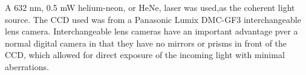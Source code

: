 
%
%
%
\clearpage


A 632 nm, 0.5 mW helium-neon, or HeNe, laser was used,as the coherent light
source.
The CCD used was from a Panasonic Lumix DMC-GF3 interchangeable lens camera.
Interchangeable lens cameras have an important advantage pver a normal digital
camera in that they have no mirrors or prisms in front of
the CCD\@, which allowed for direct exposure of the incoming light with minimal
aberrations.

